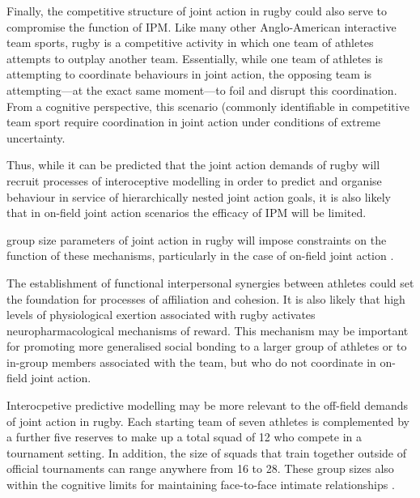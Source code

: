 \begin{CJK}{UTF8}{gbsn}
Finally, the competitive structure of joint action in rugby could also serve to compromise the function of IPM.  Like many other Anglo-American interactive team sports, rugby is a competitive activity in which one team of athletes attempts to outplay another team.  Essentially, while one team of athletes is attempting to coordinate behaviours in joint action, the opposing team is attempting---at the exact same moment---to foil and disrupt this coordination.  From a cognitive perspective, this scenario  (commonly identifiable in competitive team sport require coordination in joint action under conditions of extreme uncertainty.


Thus, while it can be predicted that the joint action demands of rugby will recruit processes of interoceptive modelling in order to predict and organise behaviour in service of hierarchically nested joint action goals, it is also likely that in on-field joint action scenarios the efficacy of IPM will be limited.



 group size parameters of joint action in rugby will impose constraints on the function of these mechanisms, particularly in the case of on-field joint action \citep{Mogan2017}.









The establishment of functional interpersonal synergies between athletes could set the foundation for processes of affiliation and cohesion\citep{Marsh2009}.  It is also likely that high levels of physiological exertion associated with rugby activates neuropharmacological mechanisms of reward.  This mechanism may be important for promoting more generalised social bonding to a larger group of athletes or to in-group members associated with the team, but who do not coordinate in on-field joint action.


Interocpetive predictive modelling may be more relevant to the off-field demands of joint action in rugby.  Each starting team of seven athletes is complemented by a further five reserves to make up a total squad of 12 who compete in a tournament setting.  In addition, the size of squads that train together outside of official tournaments can range anywhere from 16 to 28.  These group sizes also within the cognitive limits for maintaining face-to-face intimate relationships \citep[thought to be in the realm of 15-25, see][]{Dunbar1992,Dunbar2010}.




\end{CJK}
